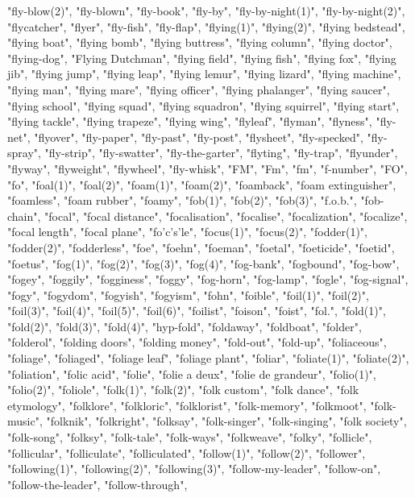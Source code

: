 "fly-blow(2)",
"fly-blown",
"fly-book",
"fly-by",
"fly-by-night(1)",
"fly-by-night(2)",
"flycatcher",
"flyer",
"fly-fish",
"fly-flap",
"flying(1)",
"flying(2)",
"flying bedstead",
"flying boat",
"flying bomb",
"flying buttress",
"flying column",
"flying doctor",
"flying-dog",
"Flying Dutchman",
"flying field",
"flying fish",
"flying fox",
"flying jib",
"flying jump",
"flying leap",
"flying lemur",
"flying lizard",
"flying machine",
"flying man",
"flying mare",
"flying officer",
"flying phalanger",
"flying saucer",
"flying school",
"flying squad",
"flying squadron",
"flying squirrel",
"flying start",
"flying tackle",
"flying trapeze",
"flying wing",
"flyleaf",
"flyman",
"flyness",
"fly-net",
"flyover",
"fly-paper",
"fly-past",
"fly-post",
"flysheet",
"fly-specked",
"fly-spray",
"fly-strip",
"fly-swatter",
"fly-the-garter",
"flyting",
"fly-trap",
"flyunder",
"flyway",
"flyweight",
"flywheel",
"fly-whisk",
"FM",
"Fm",
"fm",
"f-number",
"FO",
"fo",
"foal(1)",
"foal(2)",
"foam(1)",
"foam(2)",
"foamback",
"foam extinguisher",
"foamless",
"foam rubber",
"foamy",
"fob(1)",
"fob(2)",
"fob(3)",
"f.o.b.",
"fob-chain",
"focal",
"focal distance",
"focalisation",
"focalise",
"focalization",
"focalize",
"focal length",
"focal plane",
"fo'c's'le",
"focus(1)",
"focus(2)",
"fodder(1)",
"fodder(2)",
"fodderless",
"foe",
"foehn",
"foeman",
"foetal",
"foeticide",
"foetid",
"foetus",
"fog(1)",
"fog(2)",
"fog(3)",
"fog(4)",
"fog-bank",
"fogbound",
"fog-bow",
"fogey",
"foggily",
"fogginess",
"foggy",
"fog-horn",
"fog-lamp",
"fogle",
"fog-signal",
"fogy",
"fogydom",
"fogyish",
"fogyism",
"fohn",
"foible",
"foil(1)",
"foil(2)",
"foil(3)",
"foil(4)",
"foil(5)",
"foil(6)",
"foilist",
"foison",
"foist",
"fol.",
"fold(1)",
"fold(2)",
"fold(3)",
"fold(4)",
"hyp-fold",
"foldaway",
"foldboat",
"folder",
"folderol",
"folding doors",
"folding money",
"fold-out",
"fold-up",
"foliaceous",
"foliage",
"foliaged",
"foliage leaf",
"foliage plant",
"foliar",
"foliate(1)",
"foliate(2)",
"foliation",
"folic acid",
"folie",
"folie a deux",
"folie de grandeur",
"folio(1)",
"folio(2)",
"foliole",
"folk(1)",
"folk(2)",
"folk custom",
"folk dance",
"folk etymology",
"folklore",
"folkloric",
"folklorist",
"folk-memory",
"folkmoot",
"folk-music",
"folknik",
"folkright",
"folksay",
"folk-singer",
"folk-singing",
"folk society",
"folk-song",
"folksy",
"folk-tale",
"folk-ways",
"folkweave",
"folky",
"follicle",
"follicular",
"folliculate",
"folliculated",
"follow(1)",
"follow(2)",
"follower",
"following(1)",
"following(2)",
"following(3)",
"follow-my-leader",
"follow-on",
"follow-the-leader",
"follow-through",
